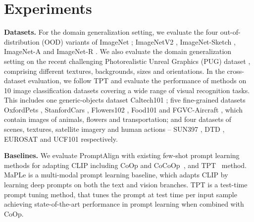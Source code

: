 \documentclass[a4paper]{article}
\begin{document}
\section{Experiments}
\textbf{Datasets.} %
%
For the domain generalization setting, we evaluate the four out-of-distribution (OOD) variants of ImageNet \cite{deng2009imagenet}; ImageNetV2 \cite{recht2019imagenet}, ImageNet-Sketch \cite{wang2019learning}, ImageNet-A \cite{hendrycks2021natural} and ImageNet-R \cite{hendrycks2021many}. We also evaluate the domain generalization setting on the recent challenging Photorealistic Unreal Graphics (PUG) dataset \cite{bordes2023pug}, comprising different textures, backgrounds, sizes and orientations. In the cross-dataset evaluation, we follow TPT \cite{shu2022test} and evaluate the performance of methods on 10 image classification datasets covering a wide range of visual recognition tasks. This includes one generic-objects dataset Caltech101 \cite{fei2004learning}; five fine-grained datasets OxfordPets \cite{parkhi2012cats}, StanfordCars \cite{krause20133d}, Flowers102 \cite{nilsback2008automated}, Food101 \cite{bossard2014food} and FGVC-Aircraft \cite{maji2013fine}, which contain images of animals, flowers and transportation; and four datasets of scenes, textures, satellite imagery and human actions -- SUN397 \cite{sun2020test}, DTD \cite{cimpoi2014describing}, EUROSAT \cite{helber2019eurosat} and UCF101 \cite{soomro2012dataset} respectively. \par

\textbf{Baselines.}
We evaluate PromptAlign with existing few-shot prompt learning methods for adapting CLIP including CoOp \cite{zhou2022coop} and CoCoOp~\cite{zhou2022cocoop}, and TPT~\cite{shu2022test} method. MaPLe \cite{khattakMaPLe} is a multi-modal prompt learning baseline, which adapts CLIP by learning deep prompts on both the text and vision branches. TPT is a test-time prompt tuning method, that tunes the prompt at test time per input sample achieving state-of-the-art performance in prompt learning when combined with CoOp. \par
\end{document}
